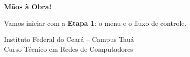 \documentclass[10pt]{beamer}
\begin{document}
\begin{frame}
    \begin{center}
        \Huge{\textbf{Mãos à Obra!}}

        \vspace{0.5cm}
        \normalsize{Vamos iniciar com a \textbf{Etapa 1}: o menu e o fluxo de controle.}

        \vspace{1.0cm}
        \small{Instituto Federal do Ceará -- Campus Tauá \\ Curso Técnico em Redes de Computadores}
    \end{center}
\end{frame}
\end{document}
